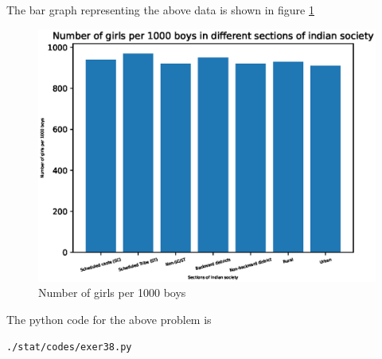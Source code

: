 The bar graph representing the above data is shown in figure \ref{fig:bar38_py}\\
\begin{figure}[!ht]
\centering
\includegraphics[width=\columnwidth]{./stat/codes/pyfigs/exer38.eps}
\caption{Number of girls per 1000 boys}
\label{fig:bar38_py}
\end{figure}
The python code for the above problem is 
\begin{lstlisting}
./stat/codes/exer38.py
\end{lstlisting}
